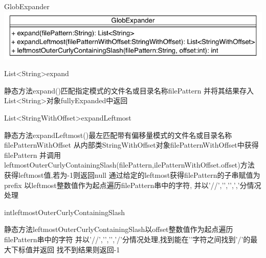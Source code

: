 \begin{XeClass}{GlobExpander}
\includegraphics[width=\textwidth]{cdig/GlobExpander.png}
    
    \begin{XeMethod}{\XePublic}{List<String>}{expand}
         
 静态方法expand()匹配指定模式的文件名或目录名称filePattern
 并将其结果存入List<String>对象fullyExpanded中返回

    \end{XeMethod}

    \begin{XeMethod}{\XePrivate}{List<StringWithOffset>}{expandLeftmost}
         
 静态方法expandLeftmost()最左匹配带有偏移量模式的文件名或目录名称filePatternWithOffset
 从内部类StringWithOffset对象filePatternWithOffset中获得filePattern
 并调用leftmostOuterCurlyContainingSlash(filePattern,ilePatternWithOffset.offset)方法
 获得leftmost值,若为-1则返回null
 通过给定的leftmost获得filePattern的子串赋值为prefix
 以leftmost整数值作为起点遍历filePattern串中的字符,
 并以'//','{','}',','分情况处理

    \end{XeMethod}

    \begin{XeMethod}{\XePrivate}{int}{leftmostOuterCurlyContainingSlash}
         
 静态方法leftmostOuterCurlyContainingSlash以offset整数值作为起点遍历filePattern串中的字符
 并以'//','{','}','/'分情况处理,找到能在'{}'字符之间找到'/'的最大下标值并返回
 找不到结果则返回-1

    \end{XeMethod}


\end{XeClass}
